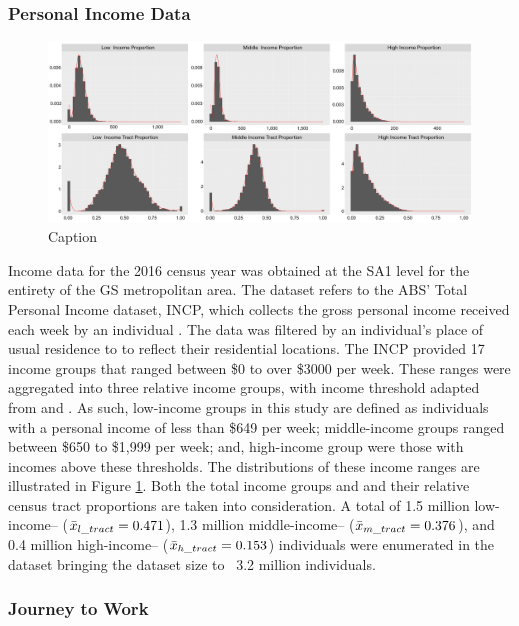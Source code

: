 \subsubsection{Personal Income Data}

\begin{figure}[H]
    \centering
    \includegraphics[width=1\textwidth]{body/figures/histograms_income.png}
    \caption{Caption}
    \label{fig:income_historgram}
\end{figure}

Income data for the 2016 census year was obtained at the SA1 level for the entirety of the GS metropolitan area. The dataset refers to the ABS' Total Personal Income dataset, INCP, which collects the gross personal income received each week by an individual \citep{abs_2017}. The data was filtered by an individual's place of usual residence to to reflect their residential locations. The INCP provided 17 income groups that ranged between \$0 to over \$3000 per week. These ranges were aggregated into three relative income groups, with income threshold adapted from \cite{acoss_2016} and \cite{p_aus_2019}. As such, low-income groups in this study are defined as individuals with a personal income of less than \$649 per week; middle-income groups ranged between \$650 to \$1,999 per week; and, high-income group were those with incomes above these thresholds. The distributions of these income ranges are illustrated in Figure \ref{fig:income_historgram}. Both the total income groups and and their relative census tract proportions are taken into consideration. A total of 1.5 million low-income-- ($\Bar{x}_{l\_tract} = 0.471$), 1.3 million middle-income-- ($\Bar{x}_{m\_tract} = 0.376$), and 0.4 million high-income-- ($\Bar{x}_{h\_tract} = 0.153$) individuals were enumerated in the dataset bringing the dataset size to ~3.2 million individuals.\\

\subsubsection{Journey to Work}

